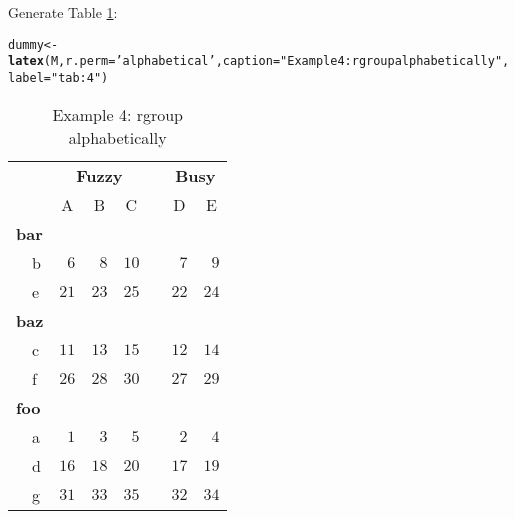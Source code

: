 \documentclass{article}\usepackage[]{graphicx}\usepackage[]{color}
\makeatletter
\newcommand{\hlstr}[1]{\textcolor[rgb]{0.192,0.494,0.8}{#1}}%
\newcommand{\hlstd}[1]{\textcolor[rgb]{0.345,0.345,0.345}{#1}}%
\newcommand{\hlkwb}[1]{\textcolor[rgb]{0.69,0.353,0.396}{#1}}%
\newcommand{\hlkwc}[1]{\textcolor[rgb]{0.333,0.667,0.333}{#1}}%
\newcommand{\hlkwd}[1]{\textcolor[rgb]{0.737,0.353,0.396}{\textbf{#1}}}%
\newenvironment{kframe}{%
 \def\at@end@of@kframe{}%
 \ifinner\ifhmode%
  \def\at@end@of@kframe{\end{minipage}}%
  \begin{minipage}{\columnwidth}%
 \fi\fi%
 \def\FrameCommand##1{\hskip\@totalleftmargin \hskip-\fboxsep
 \colorbox{shadecolor}{##1}\hskip-\fboxsep
     \hskip-\linewidth \hskip-\@totalleftmargin \hskip\columnwidth}%
 \MakeFramed {\advance\hsize-\width
   \@totalleftmargin\z@ \linewidth\hsize
   \@setminipage}}%
 {\par\unskip\endMakeFramed%
 \at@end@of@kframe}
\makeatother
\begin{document}
Generate Table  \ref{tab:4}:
\begin{kframe}
\begin{alltt}
\hlstd{dummy} \hlkwb{<-} \hlkwd{latex}\hlstd{(M,} \hlkwc{r.perm}\hlstd{=}\hlstr{'alphabetical'}\hlstd{,} \hlkwc{caption}\hlstd{=}\hlstr{"Example 4: rgroup alphabetically"}\hlstd{,} \hlkwc{label}\hlstd{=}\hlstr{"tab:4"}\hlstd{)}
\end{alltt}
\end{kframe}%
\begin{table}[!tbp]
\caption{Example 4: rgroup alphabetically\label{tab:4}} 
\begin{center}
\begin{tabular}{lrrrcrr}
\hline\hline
\multicolumn{1}{l}{\bfseries }&\multicolumn{3}{c}{\bfseries Fuzzy}&\multicolumn{1}{c}{\bfseries }&\multicolumn{2}{c}{\bfseries Busy}\tabularnewline
\cline{2-4} \cline{6-7}
\multicolumn{1}{l}{}&\multicolumn{1}{c}{A}&\multicolumn{1}{c}{B}&\multicolumn{1}{c}{C}&\multicolumn{1}{c}{}&\multicolumn{1}{c}{D}&\multicolumn{1}{c}{E}\tabularnewline
\hline
{\bfseries bar}&&&&&&\tabularnewline
~~b&$ 6$&$ 8$&$10$&&$ 7$&$ 9$\tabularnewline
~~e&$21$&$23$&$25$&&$22$&$24$\tabularnewline
\hline
{\bfseries baz}&&&&&&\tabularnewline
~~c&$11$&$13$&$15$&&$12$&$14$\tabularnewline
~~f&$26$&$28$&$30$&&$27$&$29$\tabularnewline
\hline
{\bfseries foo}&&&&&&\tabularnewline
~~a&$ 1$&$ 3$&$ 5$&&$ 2$&$ 4$\tabularnewline
~~d&$16$&$18$&$20$&&$17$&$19$\tabularnewline
~~g&$31$&$33$&$35$&&$32$&$34$\tabularnewline
\hline
\end{tabular}\end{center}

\end{table}
\end{document}
